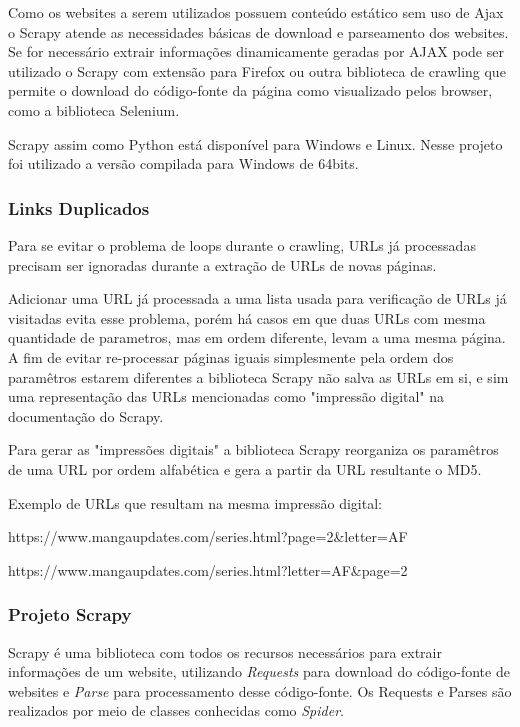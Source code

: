 \documentclass[12pt]{article}
\begin{document}
Como os websites a serem utilizados possuem conteúdo estático sem uso de Ajax o Scrapy atende as necessidades básicas de download e parseamento dos websites. Se for necessário extrair informações dinamicamente geradas por AJAX pode ser utilizado o Scrapy com extensão para Firefox ou outra biblioteca de crawling que permite o download do código-fonte da página como visualizado pelos browser, como a biblioteca Selenium.

Scrapy assim como Python está disponível para Windows e Linux. Nesse projeto foi utilizado a versão compilada para Windows de 64bits.

\subsubsection{Links Duplicados}

Para se evitar o problema de loops durante o crawling, URLs já processadas precisam ser ignoradas durante a extração de URLs de novas páginas.

Adicionar uma URL já processada a uma lista usada para verificação de URLs já visitadas evita esse problema, porém há casos em que duas URLs com mesma quantidade de parametros, mas em ordem diferente, levam a uma mesma página. A fim de evitar re-processar páginas iguais simplesmente pela ordem dos paramêtros estarem diferentes a biblioteca Scrapy não salva as URLs em si, e sim uma representação das URLs mencionadas como "impressão digital" na documentação do Scrapy. 

Para gerar as "impressões digitais" a biblioteca Scrapy reorganiza os paramêtros de uma URL por ordem alfabética e gera a partir da URL resultante o MD5.


Exemplo de URLs que resultam na mesma impressão digital:


https://www.mangaupdates.com/series.html?page=2\&letter=AF

https://www.mangaupdates.com/series.html?letter=AF\&page=2


\subsubsection{Projeto Scrapy}

Scrapy é uma biblioteca com todos os recursos necessários para extrair informações de um website, utilizando \textit{Requests} para download do código-fonte de websites e \textit{Parse} para processamento desse código-fonte. Os Requests e Parses são realizados por meio de classes conhecidas como \textit{Spider}.
\end{document}
